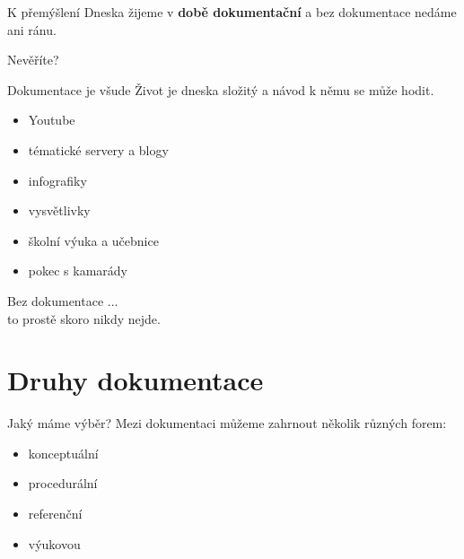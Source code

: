 \documentclass[12pt]{beamer}
\begin{document}
		\begin{frame}{K přemýšlení}
                Dneska žijeme v \textbf{době dokumentační} a bez dokumentace nedáme ani ránu. 

                \vspace{20pt}

                Nevěříte?
        \end{frame}

        \begin{frame}{Dokumentace je všude}
            Život je dneska složitý a návod k němu se může hodit.
            \begin{itemize}
                \item Youtube
                \item tématické servery a blogy
                \item infografiky
                \item vysvětlivky
                \item školní výuka a učebnice
                \item pokec s kamarády
            \end{itemize}
        \end{frame}

        \begin{frame}{}

                {\Large Bez dokumentace ... \\ to prostě skoro nikdy nejde.}

		\end{frame}
	
    
    \section{Druhy dokumentace}
    
    	\begin{frame}{Jaký máme výběr?}
    	Mezi dokumentaci můžeme zahrnout několik různých forem:
    	\begin{itemize}
    		\item konceptuální 
    		\item procedurální 
    		\item referenční
    		\item výukovou
    	\end{itemize}
		\end{frame}
	
\end{document}
